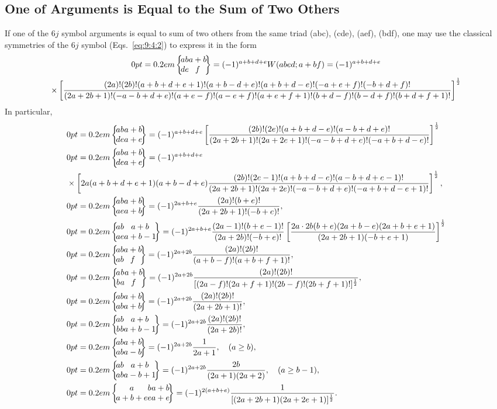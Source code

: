 \subsection{One of Arguments is Equal to the Sum of Two Others}\label{sec:9.5.2}
If one of the $6 j$ symbol arguments is equal to sum of two others from the same triad (abc), (cde), (aef), (bdf), one may use the classical symmetries of the $6 j$ symbol (Eqs.~\eqref{eq:9:4:2}) to express it in the form
\begin{multline}
\sixj{a}{b}{a+b}{d}{e}{f}=(-1)^{a+b+d+e} W(a b e d ; a+b f)=(-1)^{a+b+d+e}  \\
\times\left[\frac{(2 a)!(2 b)!(a+b+d+e+1)!(a+b-d+e)!(a+b+d-e)!(-a+e+f)!(-b+d+f)!}{(2 a+2 b+1)!(-a-b+d+e)!(a+e-f)!(a-e+f)!(a+e+f+1)!(b+d-f)!(b-d+f)!(b+d+f+1)!}\right]^{\frac{1}{2}} \label{eq:9:5:3}
\end{multline}
In particular,
\begin{align}
&\sixj{a}{b}{a+b}{d}{e}{a+e}
=(-1)^{a+b+d+e}\left[\frac{(2 b)!(2 e)!(a+b+d-e)!(a-b+d+e)!}{(2 a+2 b+1)!(2 a+2 e+1)!(-a-b+d+e)!(-a+b+d-e)!}\right]^{\frac{1}{2}}  \label{eq:9:5:4}\\
&\sixj{a}{b}{a+b}{d}{e}{a+e}=(-1)^{a+b+d+e} \notag\\
& \times\left[2 a(a+b+d+e+1)(a+b-d+e) \frac{(2 b)!(2 e-1)!(a+b+d-e)!(a-b+d+e-1)!}{(2 a+2 b+1)!(2 a+2 e)!(-a-b+d+e)!(-a+b+d-e+1)!}\right]^{\frac{1}{2}}, \\
&\sixj{a}{b}{a+b}{a}{e}{a+b}=(-1)^{2a+b+e} 
\frac{(2 a)!(b+e)!}{(2 a+2 b+1)!(-b+e)!},\\
&\sixj{a}{b}{a+b}{a}{e}{a+b-1}=(-1)^{2 a+b+e} \frac{(2 a-1)!(b+e-1)!}{(2 a+2 b)!(-b+e)!}\left[\frac{2 a \cdot 2 b(b+e)(2 a+b-e)(2 a+b+e+1)}{(2 a+2 b+1)(-b+e+1)}\right]^{\frac{1}{2}}  \label{eq:9:5:7}\\
&\sixj{a}{b}{a+b}{a}{b}{f}=(-1)^{2 a+2 b} \frac{(2 a)!(2 b)!}{(a+b-f)!(a+b+f+1)!},  \label{eq:9:5:8}\\
&\sixj{a}{b}{a+b}{b}{a}{f}=(-1)^{2 a+2 b} \frac{(2 a)!(2 b)!}{[(2 a-f)!(2 a+f+1)!(2 b-f)!(2 b+f+1)!]^{\frac{1}{2}}},  \label{eq:9:5:9}\\
&\sixj{a}{b}{a+b}{a}{b}{a+b}=(-1)^{2 a+2 b} \frac{(2 a)!(2 b)!}{(2 a+2 b+1)!}, \label{eq:9:5:10}\\
&\sixj{a}{b}{a+b}{b}{b}{a+b-1}=(-1)^{2 a+2 b} \frac{(2 a)!(2 b)!}{(2 a+2 b)!}, \label{eq:9:5:11} \\
&\sixj{a}{b}{a+b}{a}{b}{a-b}=(-1)^{2 a+2 b} \frac{1}{2 a+1}, \quad(a \geq b), \label{eq:9:5:12}\\
&\sixj{a}{b}{a+b}{a}{b}{a-b+1}=(-1)^{2 a+2 b} \frac{2 b}{(2 a+1)(2 a+2)}, \quad(a \geq b-1) , \label{eq:9:5:13}\\
&\sixj{a}{b}{a+b}{a+b+e}{e}{a+e}=(-1)^{2(a+b+e)} \frac{1}{[(2 a+2 b+1)(2 a+2 e+1)]^{\frac{1}{2}}}. \label{eq:9:5:14}
\end{align}

